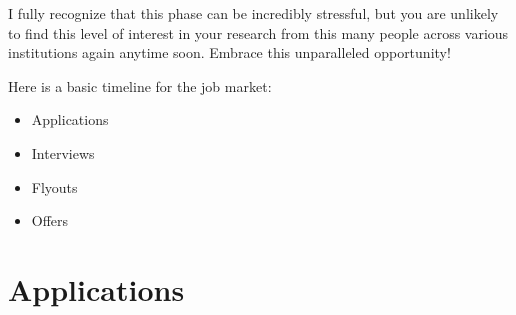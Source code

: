\documentclass[12pt]{article}
\begin{document}
I fully recognize that this phase can be incredibly stressful, but you are unlikely to find this level of interest in your research from this many people across various institutions again anytime soon. Embrace this unparalleled opportunity!

Here is a basic timeline for the job market:
\begin{itemize}
\item Applications
\item Interviews
\item Flyouts
\item Offers
\end{itemize}

\section{Applications}
\label{sec:orga8c69c0}
\end{document}
